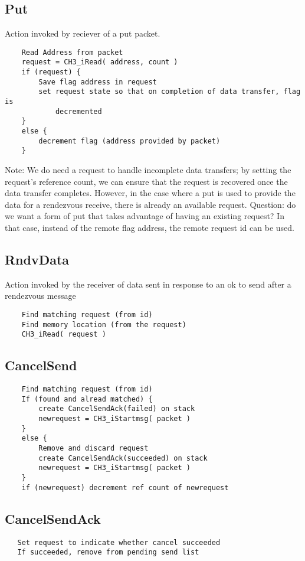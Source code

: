 \documentclass{article}
\begin{document}
\subsection{Put}
Action invoked by reciever of a put packet.  
\begin{verbatim}
    Read Address from packet
    request = CH3_iRead( address, count )
    if (request) {
        Save flag address in request
        set request state so that on completion of data transfer, flag is
            decremented
    }
    else {
        decrement flag (address provided by packet)
    }
\end{verbatim}
Note: We do need a request to handle incomplete data transfers; by setting the
request's reference count, we can ensure that the request is recovered once
the data transfer completes.  However, in the case where a put is used to
provide the data for a rendezvous receive, there is already an available
request.  Question: do we want a form of put that takes advantage of having an
existing request?  In that case, instead of the remote flag address, the
remote request id can be used.

\subsection{RndvData}
Action invoked by the receiver of data sent in response to an ok to send after
a rendezvous message
\begin{verbatim}
    Find matching request (from id)
    Find memory location (from the request)
    CH3_iRead( request )
\end{verbatim}

\subsection{CancelSend}
\begin{verbatim}
    Find matching request (from id)
    If (found and alread matched) {
        create CancelSendAck(failed) on stack
        newrequest = CH3_iStartmsg( packet )
    }
    else {
        Remove and discard request
        create CancelSendAck(succeeded) on stack
        newrequest = CH3_iStartmsg( packet )
    }
    if (newrequest) decrement ref count of newrequest
\end{verbatim}

\subsection{CancelSendAck}
\begin{verbatim}
   Set request to indicate whether cancel succeeded
   If succeeded, remove from pending send list
\end{verbatim}
\end{document}
